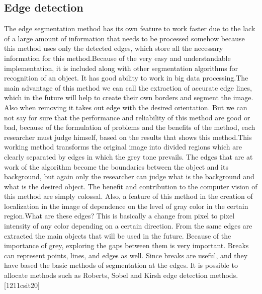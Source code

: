 \subsection{Edge detection}\label{sec:3.4.3}
\vspace{-0.5cm}
\noindent The edge segmentation method has its own feature to work faster due to the lack of a large amount of information that needs to be processed somehow because this method uses only the detected edges, which store all the necessary information for this method.Because of the very easy and understandable implementation, it is included along with other segmentation algorithms for recognition of an object. It has good ability to work in big data processing.The main advantage of this method we can call the extraction of accurate edge lines, which in the future will help to create their own borders and segment the image. Also when removing it takes out edge with the desired orientation. But we can not say for sure that the performance and reliability of this method are good or bad, because of the formulation of problems and the benefits of the method, each researcher must judge himself, based on the results that shows this method.This working method transforms the original image into divided regions which are clearly separated by edges in which the grey tone prevails. The edges that are at work of the algorithm become the boundaries between the object and its background, but again only the researcher can judge what is the background and what is the desired object. The benefit and contribution to the computer vision of this method are simply colossal. Also, a feature of this method in the creation of localization in the image of dependence on the level of gray color in the certain region.What are these edges? This is basically a change from pixel to pixel intensity of any color depending on a certain direction. From the same edges are extracted the main objects that will be used in the future. Because of the importance of grey, exploring the gaps between them is very important. Breaks can represent points, lines, and edges as well. Since breaks are useful, and they have based the basic methods of segmentation at the edges. It is possible to allocate methods such as Roberts, Sobel and Kirsh edge detection methods.[1211csit20]


